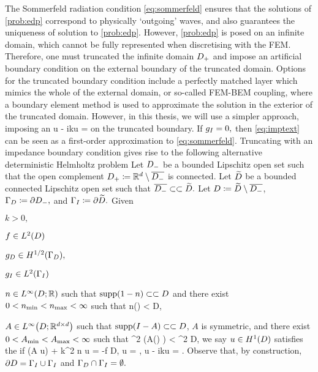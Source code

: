 The Sommerfeld radiation condition \eqref{eq:sommerfeld} ensures that the solutions of \cref{prob:edp} correspond to physically `outgoing' waves, and also guarantees the uniqueness of solution to \cref{prob:edp}. However, \cref{prob:edp} is posed on an infinite domain, which cannot be fully represented when discretising with the FEM. Therefore, one must truncated the infinite domain $D_{+}$ and impose an artificial boundary condition on the external boundary of the truncated domain. Options for the truncated boundary condition include a perfectly matched layer which mimics the whole of the external domain, or so-called FEM-BEM coupling, where a boundary element method is used to approximate the solution in the exterior of the truncated domain. However, in this thesis, we will use a simpler approach, imposing an 
\beq\label{eq:imptext}
\dn u - iku = \gI
\eeq
on the truncated boundary. If $g_{I} = 0,$ then \eqref{eq:imptext} can be seen as a first-order approximation to \eqref{eq:sommerfeld}. Truncating with an impedance boundary condition gives rise to the following alternative deterministic Helmholtz problem
\label{prob:tedp}
 Let $D_{-}$ be a bounded Lipschitz open set such that the open complement $D_{+} \coloneqq \mathbb R^{d} \setminus \overline{D_{-}}$ is connected. Let $\widetilde{D}$ be a bounded connected Lipschitz open set such that $\overline{D_{-}} \subset\subset \widetilde{D}.$ Let $D \coloneqq \widetilde{D} \setminus \overline{D_{-}}$, $\Gamma_{D} \coloneqq \partial D_{-},$ and $\Gamma_{I} \coloneqq \partial \widetilde{D}.$ Given
  \bit
  \item $k > 0,$
\item $f \in \LtD$
\item $\gD \in \HhGD,$
  \item $\gI \in \LtGI$
\item $n \in \LiDRR$ such that $\supp\mleft(1-n\mright) \compcont D$ and there exist $0 < n_{\min} < n_{\max} < \infty$ such that
  \beqs
\nmin \leq n(\bx) < \nmax \tfae \bx \in D,
  \eeqs
\item $A \in \LiDRRdtd$ such that $\supp\mleft(I-A\mright)\compcont D$, $A$ is symmetric, and there exist $0 < A_{\min} < A_{\max} < \infty$ such that
  \beqs
\Amin \abs{\bxi}^2 \leq \mleft(A(\bx) \bxi \mright) \cdot \bxibar < \Amax \abs{\bxi}^2 \tfa \bxi \in \CCd \tfae \bx \in D,
  \eeqs
  \eit
  we say $u \in \HoD$ satisfies the  if
  \beqs
\grad \cdot \mleft(A \grad u\mright) + k^2 n u = -f \tin D,
\eeqs
\beqs
\trGD u = \gD, \tand
\eeqs
\beq\label{eq:ibc}
\trGI \dn u - ik\trGI u = \gI.
\eeq
\eprob
Observe that, by construction, $\partial D = \Gamma_{I} \cup \Gamma_{I}$ and $\Gamma_{D} \cap \Gamma_{I} = \emptyset.$


